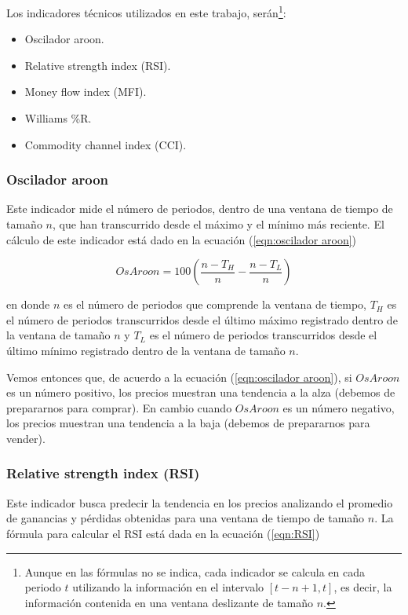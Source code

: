\documentclass[12pt]{scrbook}
\theoremstyle{break}
\theoremstyle{break}
\begin{document}
Los indicadores técnicos utilizados en este trabajo, serán\footnote{Aunque en las fórmulas no se indica, cada indicador se calcula en cada periodo $t$ utilizando la información en el intervalo $\left[t-n + 1, t\right]$, es decir, la información contenida en una ventana deslizante de tamaño $n$. }:

\begin{itemize}
\item Oscilador aroon.

\item Relative strength index (RSI).

\item Money flow index (MFI).

\item Williams \%R.

\item Commodity channel index (CCI).
\end{itemize}


\subsubsection{Oscilador aroon}
\label{subsubseccion:Oscilador Aroon}
Este indicador mide el número de periodos, dentro de una ventana de tiempo de tamaño $n$, que han transcurrido desde el máximo y el mínimo más reciente. El cálculo de este indicador está dado en la ecuación (\ref{eqn:oscilador aroon})

\begin{equation} \label{eqn:oscilador aroon}
OsAroon = 100 \left( \dfrac{  n - T_H  } { n } - \dfrac{  n - T_L  } { n } \right)
\end{equation}

en donde $n$ es el número de periodos que comprende la ventana de tiempo, $T_H$ es el número de periodos transcurridos desde el último máximo registrado dentro de la ventana de tamaño $n$ y $T_L$ es el número de periodos transcurridos desde el último mínimo registrado dentro de la ventana de tamaño $n$.

Vemos entonces que, de acuerdo a la ecuación (\ref{eqn:oscilador aroon}), si $OsAroon$ es un número positivo, los precios muestran una tendencia a la alza (debemos de prepararnos para comprar). En cambio cuando $OsAroon$ es un número negativo, los precios muestran una tendencia a la baja (debemos de prepararnos para vender).

\subsubsection{Relative strength index (RSI)}
\label{subsubseccion:RSI}
Este indicador busca predecir la tendencia en los precios analizando el promedio de ganancias y pérdidas obtenidas para una ventana de tiempo de tamaño $n$. La fórmula para calcular el RSI está dada en la ecuación (\ref{eqn:RSI})
\end{document}
